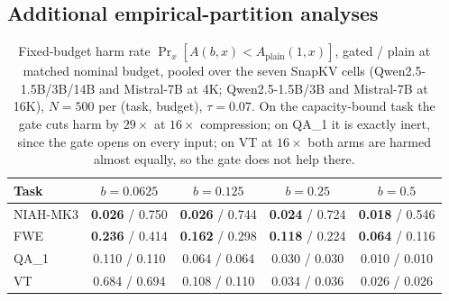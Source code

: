 \subsection{Additional empirical-partition analyses}

\begin{table}[t]
\centering
\caption{Fixed-budget harm rate $\Pr_x[A(b, x) < A_{\mathrm{plain}}(1, x)]$,
gated / plain at matched nominal budget, pooled over the seven SnapKV cells
(Qwen2.5-1.5B/3B/14B and Mistral-7B at 4K; Qwen2.5-1.5B/3B and Mistral-7B at
16K), $N = 500$ per (task, budget), $\tau = 0.07$. On the capacity-bound task
the gate cuts harm by $29\times$ at $16\times$ compression; on QA\_1 it is
exactly inert, since the gate opens on every input; on VT at $16\times$ both
arms are harmed almost equally, so the gate does not help there.}
\label{tab:harm-rate}
\begin{tabular}{lcccc}
\toprule
Task & $b = 0.0625$ & $b = 0.125$ & $b = 0.25$ & $b = 0.5$ \\
\midrule
NIAH-MK3 & \textbf{0.026} / 0.750 & \textbf{0.026} / 0.744 & \textbf{0.024} / 0.724 & \textbf{0.018} / 0.546 \\
FWE      & \textbf{0.236} / 0.414 & \textbf{0.162} / 0.298 & \textbf{0.118} / 0.224 & \textbf{0.064} / 0.116 \\
QA\_1    & 0.110 / 0.110          & 0.064 / 0.064          & 0.030 / 0.030          & 0.010 / 0.010 \\
VT       & 0.684 / 0.694          & 0.108 / 0.110          & 0.034 / 0.036          & 0.026 / 0.026 \\
\bottomrule
\end{tabular}
\end{table}




